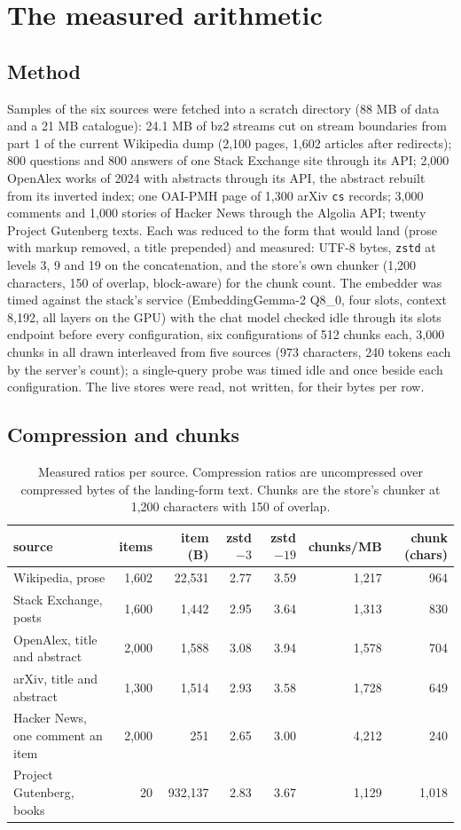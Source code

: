 \documentclass[11pt]{article}
\theoremstyle{plain}
\theoremstyle{definition}
\theoremstyle{remark}
\newcommand{\code}[1]{\texttt{#1}}
\begin{document}
\section{The measured arithmetic}\label{sec:arithmetic}

\subsection{Method}
Samples of the six sources were fetched into a scratch directory (88 MB of data and a 21 MB
catalogue): 24.1 MB of bz2 streams cut on stream boundaries from part 1 of the current Wikipedia
dump (2,100 pages, 1,602 articles after redirects); 800 questions and 800 answers of one Stack
Exchange site through its API; 2,000 OpenAlex works of 2024 with abstracts through its API, the
abstract rebuilt from its inverted index; one OAI-PMH page of 1,300 arXiv \code{cs} records;
3,000 comments and 1,000 stories of Hacker News through the Algolia API; twenty Project Gutenberg
texts. Each was reduced to the form that would land (prose with markup removed, a title prepended)
and measured: UTF-8 bytes, \code{zstd} at levels 3, 9 and 19 on the concatenation, and the store's
own chunker (1,200 characters, 150 of overlap, block-aware) for the chunk count. The embedder was
timed against the stack's service (EmbeddingGemma-2 Q8\_0, four slots, context 8,192, all layers on
the GPU) with the chat model checked idle through its slots endpoint before every configuration,
six configurations of 512 chunks each, 3,000 chunks in all drawn interleaved from five sources
(973 characters, 240 tokens each by the server's count); a single-query probe was timed idle and
once beside each configuration. The live stores were read, not written, for their bytes per row.

\subsection{Compression and chunks}
\begin{table}[t]
\centering
\caption{Measured ratios per source. Compression ratios are uncompressed over compressed bytes of
the landing-form text. Chunks are the store's chunker at 1,200 characters with 150 of overlap.}\label{tab:ratios}
\footnotesize
\begin{tabular}{lrrrrrr}
\toprule
source & items & item (B) & zstd $-3$ & zstd $-19$ & chunks/MB & chunk (chars) \\
\midrule
Wikipedia, prose & 1,602 & 22,531 & 2.77 & 3.59 & 1,217 & 964 \\
Stack Exchange, posts & 1,600 & 1,442 & 2.95 & 3.64 & 1,313 & 830 \\
OpenAlex, title and abstract & 2,000 & 1,588 & 3.08 & 3.94 & 1,578 & 704 \\
arXiv, title and abstract & 1,300 & 1,514 & 2.93 & 3.58 & 1,728 & 649 \\
Hacker News, one comment an item & 2,000 & 251 & 2.65 & 3.00 & 4,212 & 240 \\
Project Gutenberg, books & 20 & 932,137 & 2.83 & 3.67 & 1,129 & 1,018 \\
\bottomrule
\end{tabular}
\end{table}
\end{document}
